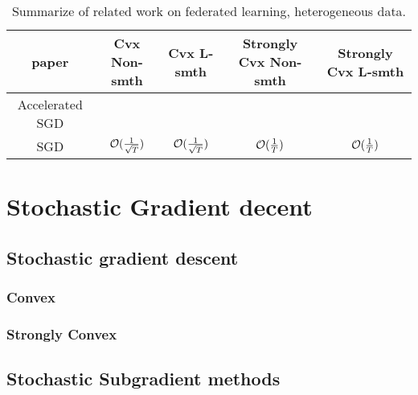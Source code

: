 

\begin{table}[h!]
\centering
\small
	\begin{tabular}{|c|c|c|c|c|}\hline
		paper         &  Cvx Non-smth & Cvx L-smth & Strongly Cvx Non-smth& Strongly Cvx L-smth \\ \hline
	Accelerated	SGD   &        &    &       &      \\\hline
	SGD    &    ${\mathcal{O}}(\frac{1}{\sqrt{T}})$  &   ${\mathcal{O}}(\frac{1}{\sqrt{T}})$  &  ${\mathcal{O}}(\frac{1}{T})$  & ${\mathcal{O}}(\frac{1}{T})$\cite{li2019convergence,haddadpour2019convergence}      \\\hline
	\end{tabular}
	\caption{Summarize of related work on federated learning, heterogeneous data.}
\end{table}


\section{Stochastic Gradient decent}




\subsection{Stochastic gradient descent}
\subsubsection{Convex}


\subsubsection{Strongly Convex}
\cite{li2019convergence}

\subsection{Stochastic Subgradient methods}

